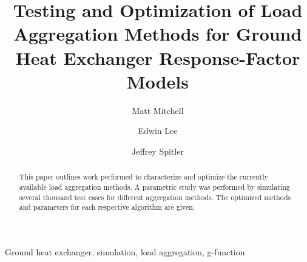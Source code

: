 \documentclass[review,12pt]{elsarticle}
\begin{document}
\begin{frontmatter}


\title{Testing and Optimization of Load Aggregation Methods for Ground Heat Exchanger Response-Factor Models}




\author[label1]{Matt Mitchell}
\author[label2]{Edwin Lee}
\author[label1]{Jeffrey Spitler}

\address[label1]{Oklahoma State University, Stillwater OK.}
\address[label2]{National Renewable Energy Laboratory, Golden CO.}


\begin{abstract}
This paper outlines work performed to characterize and optimize the currently available load aggregation methods. A parametric study was performed by simulating several thousand test cases for different aggregation methods. The optimized methods and parameters for each respective algorithm are given.
\end{abstract}

\begin{keyword}
Ground heat exchanger, simulation, load aggregation, g-function
\end{keyword}

\end{frontmatter}

\linenumbers

\end{document}
